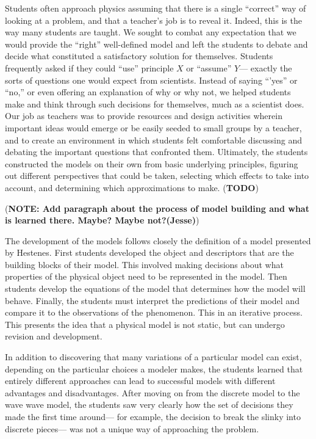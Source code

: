 \documentclass[prb,preprint,superscriptaddress]{revtex4-1}
\newcommand{\TODO}[1]{\marginpar{\raggedright\scriptsize\textbf{TODO:} #1} (\textbf{TODO})}
\newcommand{\NOTE}[1]{\marginpar{\footnotesize\textbf{NOTE}} (\textbf{NOTE: #1})}
\begin{document}
Students often approach physics assuming that there is a single ``correct'' way
of looking at a problem, and that a teacher's job is to reveal it. Indeed, this is the way many students are taught. 
We sought to combat any expectation that we would
provide the ``right'' well-defined model and left the students to debate and decide what constituted a satisfactory solution for themselves. Students frequently asked if they could ``use'' principle $X$ or ``assume'' $Y$--- exactly the sorts of questions one would expect from scientists. Instead of saying ``'yes'' or ``no,'' or even offering an explanation of why or why not, we helped students make and think through such decisions for themselves, much as a scientist does. Our job as teachers was to provide resources and design activities wherein important ideas would emerge or be easily seeded to small groups by a teacher, and to create an environment in which students felt comfortable discussing and debating the important questions that confronted them. Ultimately, the students constructed the models on their own from basic underlying
principles, figuring out different perspectives that could be taken, selecting which effects
to take into account, and determining which approximations to make. 
\TODO{Some references are warranted throughout.}

\NOTE{Add paragraph about the process of model building and what is learned there. Maybe? Maybe not?(Jesse)}

The development of the models follows closely the definition of a model presented by Hestenes\cite{hestenes1987}. First students developed the object and descriptors that are the building blocks of their model.
This involved making decisions about what properties of the physical object need to be represented in the model.
Then students develop the equations of the model that determines how the model will behave.
Finally, the students must interpret the predictions of their model and compare it to the observations of the phenomenon. 
This in an iterative process. This presents the idea that a physical model is not static, but can undergo revision and development.

In addition to discovering that many variations of a particular model can exist, depending on the particular choices a modeler makes, the students learned that entirely different approaches can lead to successful models with different advantages and disadvantages. After moving on from the discrete model to the wave wave model,  the students saw very clearly
how the set of decisions they made the first time around--- for example, the decision to break the slinky into discrete pieces--- was not  a unique way of approaching the problem.
\end{document}
